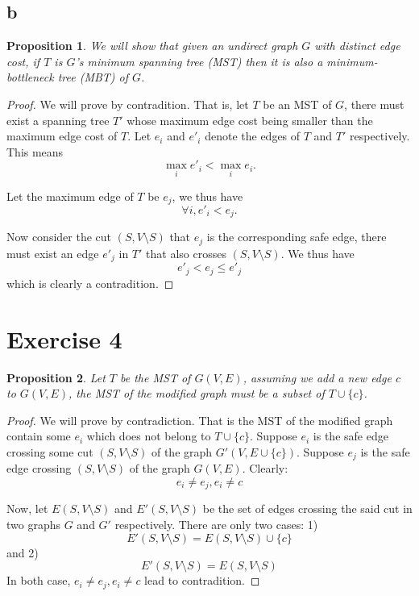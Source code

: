 \documentclass[a4paper,10pt,twoside]{article}
\newtheorem{proof}{Proof}
\newtheorem{proposition}{Proposition}
\begin{document}
\subsection*{b}
\begin{proposition}
We will show that given an undirect graph $G$ with distinct edge
cost, if $T$ is $G$'s minimum spanning
tree (MST) then it is also a minimum-bottleneck tree (MBT) of $G$.	
\end{proposition}
\begin{proof}
	We will prove by contradition. That is, let $T$ be an MST of $G$,
	there must exist a spanning tree $T'$ whose maximum edge cost
	being smaller than the maximum edge cost of $T$.
	Let $e_i$ and $e'_i$ denote the edges of $T$ and $T'$ respectively.
	This means
	\[
		\max_i{e'_i} < \max_i{e_i}.
	\]

	Let the maximum edge of $T$ be $e_j$, we thus have
	\[
		\forall i, e'_i < e_j.
	\]

	Now consider the cut $(S, V\setminus S)$ that $e_j$ is the corresponding
	safe edge, there must exist an edge $e'_j$ in $T'$ that also crosses $(S, V\setminus S)$.
	We thus have
	\[
		e'_j < e_j \leq e'_j
	\]
	which is clearly a contradition.
\end{proof}
\section*{Exercise 4}
\begin{proposition}
\label{prop:4-1}
	Let $T$ be the MST of $G(V, E)$, assuming we add a new edge $c$ to $G(V, E)$, the
	MST of the modified graph must be a subset of $T\cup \{c\}$.
\end{proposition}
\begin{proof}
	We will prove by contradiction. That is the MST of the modified graph contain some $e_i$ which
	does not belong to $T \cup \{c\}$. Suppose $e_i$ is the safe edge crossing some cut 
	$(S, V\setminus S)$ of the graph $G'(V, E \cup \{c\})$. Suppose $e_j$ is the safe edge
	crossing $(S, V\setminus S)$ of the graph $G(V, E)$. Clearly:
	\[
		e_i \neq e_j, e_i \neq c
	\]

	Now, let $E(S, V\setminus S)$ and $E'(S, V\setminus S)$ be the set of edges crossing
	the said cut in two graphs $G$ and $G'$ respectively. There are only two cases: 
	1) 
	$$E'(S, V\setminus S)=E(S, V\setminus S) \cup \{c\}$$ and 2) 
	$$E'(S, V\setminus S)=E(S, V\setminus S)$$
	In both case, $e_i \neq e_j, e_i \neq c$
	lead to contradition.

\end{proof}
\end{document}
